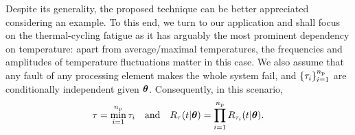 Despite its generality, the proposed technique can be better appreciated considering an example.
To this end, we turn to our application and shall focus on the thermal-cycling fatigue as it has arguably the most prominent dependency on temperature: apart from average/maximal temperatures, the frequencies and amplitudes of temperature fluctuations matter in this case.
We also assume that any fault of any processing element makes the whole system fail, and $\{ \tau_i \}_{i = 1}^{n_\text{p}}$ are conditionally independent given $\bm{\theta}$.
Consequently, in this scenario,
\begin{equation} \elab{reliability-assumptions}
  \T = \min_{i = 1}^\nprocs \T_i \hspace{1em} \text{and} \hspace{1em} \survival_\T(\t | \vwr) = \prod_{i = 1}^\nprocs \survival_{\T_i}(\t | \vwr).
\end{equation}
